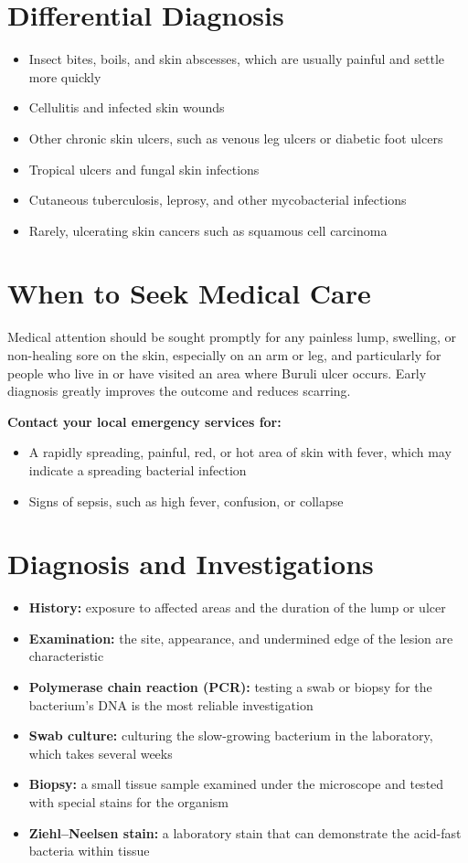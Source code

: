 \section*{Differential Diagnosis}
\begin{itemize}
    \item Insect bites, boils, and skin abscesses, which are usually painful and settle more quickly
    \item Cellulitis and infected skin wounds
    \item Other chronic skin ulcers, such as venous leg ulcers or diabetic foot ulcers
    \item Tropical ulcers and fungal skin infections
    \item Cutaneous tuberculosis, leprosy, and other mycobacterial infections
    \item Rarely, ulcerating skin cancers such as squamous cell carcinoma
\end{itemize}

\section*{When to Seek Medical Care}
Medical attention should be sought promptly for any painless lump, swelling, or non-healing sore on the skin, especially on an arm or leg, and particularly for people who live in or have visited an area where Buruli ulcer occurs. Early diagnosis greatly improves the outcome and reduces scarring.

\textbf{Contact your local emergency services for:}
\begin{itemize}
    \item A rapidly spreading, painful, red, or hot area of skin with fever, which may indicate a spreading bacterial infection
    \item Signs of sepsis, such as high fever, confusion, or collapse
\end{itemize}

\section*{Diagnosis and Investigations}
\begin{itemize}
    \item \textbf{History:} exposure to affected areas and the duration of the lump or ulcer
    \item \textbf{Examination:} the site, appearance, and undermined edge of the lesion are characteristic
    \item \textbf{Polymerase chain reaction (PCR):} testing a swab or biopsy for the bacterium's DNA is the most reliable investigation
    \item \textbf{Swab culture:} culturing the slow-growing bacterium in the laboratory, which takes several weeks
    \item \textbf{Biopsy:} a small tissue sample examined under the microscope and tested with special stains for the organism
    \item \textbf{Ziehl--Neelsen stain:} a laboratory stain that can demonstrate the acid-fast bacteria within tissue
\end{itemize}

